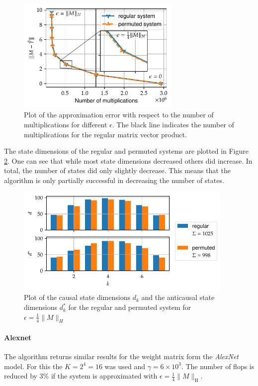 \documentclass[doctype=mastersthesis,BCOR=15mm,biblatex]{ldvbook}%
\begin{document}
\begin{figure}[!htb]
	\centering
	\includegraphics[width=0.7\textwidth]{Plots/perm_example_mobilenet_error.pdf}
	\caption{Plot of the approximation error with respect to the number of multiplications for different $\epsilon$. 
		The black line indicates the number of multiplications for the regular matrix vector product. 
	}
	\label{fig:mobilenet_err_cost_perm}
\end{figure}

The state dimensions of the regular and permuted systems are plotted in Figure\,\ref{fig:mobilenet_state_dims_perm}.
One can see that while most state dimensions decreased others did increase.
In total, the number of states did only slightly decrease.
This means that the algorithm is only partially successful in decreasing the number of states.
\begin{figure}[!htb]
	\centering
	\includegraphics[width=0.93\textwidth]{Plots/perm_example_mobilenet_state_dims.pdf}
	\caption{Plot of the causal state dimensions $d_k$ and the anticausal state dimensions $d_k^*$ for the regular and permuted system for $\epsilon = \frac{1}{4} \|M\|_H$
	}
	\label{fig:mobilenet_state_dims_perm}
\end{figure}

\paragraph{Alexnet}
The algorithm returns similar results for the weight matrix form the \emph{AlexNet} model.
For this the $K = 2^4 = 16$ was used and $\gamma =  6\times10^3$.
The number of flops is reduced by $3\%$ if the system is approximated with $\epsilon = \frac{1}{4}\|M\|_\text{H}$.
\end{document}

